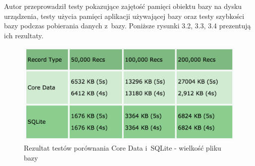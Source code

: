 
Autor przeprowadził testy pokazujące zajętość pamięci obiektu bazy na dysku urządzenia, testy użycia pamięci aplikacji używającej bazy oraz testy szybkości bazy podczas pobierania danych z~bazy. Poniższe rysunki 3.2, 3.3, 3.4 prezentują ich rezultaty.

\begin{figure}
\centering
	\includegraphics[width=13cm]{img/drdobbs_storage_test.png}
	\caption{Rezultat testów porównania Core Data i~SQLite - wielkość pliku bazy }
	\label{fig: CoreData_SQLite_storage_test}
\end{figure}

